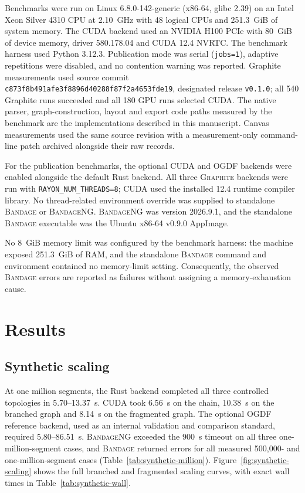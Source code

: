 \documentclass[11pt]{article}
\newcommand{\graphite}{\textsc{Graphite}\xspace}
\newcommand{\bandage}{\textsc{Bandage}\xspace}
\newcommand{\bandageng}{\textsc{BandageNG}\xspace}
\begin{document}
Benchmarks were run on Linux 6.8.0-142-generic (x86-64, glibc 2.39) on an Intel Xeon Silver 4310 CPU at 2.10~GHz with 48 logical CPUs and 251.3~GiB of system memory. The CUDA backend used an NVIDIA H100 PCIe with 80~GiB of device memory, driver 580.178.04 and CUDA 12.4 NVRTC. The benchmark harness used Python 3.12.3. Publication mode was serial (\texttt{jobs=1}), adaptive repetitions were disabled, and no contention warning was reported. Graphite measurements used source commit \texttt{c873f8b491afe3f8896d40288f87f2a4653fde19}, designated release \texttt{v0.1.0}; all 540 Graphite runs succeeded and all 180 GPU runs selected CUDA. The native parser, graph-construction, layout and export code paths measured by the benchmark are the implementations described in this manuscript. Canvas measurements used the same source revision with a measurement-only command-line patch archived alongside their raw records.

For the publication benchmarks, the optional CUDA and OGDF backends were enabled alongside the default Rust backend. All three \graphite backends were run with \texttt{RAYON\_NUM\_THREADS=8}; CUDA used the installed 12.4 runtime compiler library. No thread-related environment override was supplied to standalone \bandage or \bandageng. \bandageng was version 2026.9.1, and the standalone \bandage executable was the Ubuntu x86-64 v0.9.0 AppImage.

No 8~GiB memory limit was configured by the benchmark harness: the machine exposed 251.3~GiB of RAM, and the standalone \bandage command and environment contained no memory-limit setting. Consequently, the observed \bandage errors are reported as failures without assigning a memory-exhaustion cause.

\section{Results}
\subsection{Synthetic scaling}
At one million segments, the Rust backend completed all three controlled topologies in 5.70--13.37~s. CUDA took 6.56~s on the chain, 10.38~s on the branched graph and 8.14~s on the fragmented graph. The optional OGDF reference backend, used as an internal validation and comparison standard, required 5.80--86.51~s. \bandageng exceeded the 900~s timeout on all three one-million-segment cases, and \bandage returned errors for all measured 500,000- and one-million-segment cases (Table~\ref{tab:synthetic-million}). Figure~\ref{fig:synthetic-scaling} shows the full branched and fragmented scaling curves, with exact wall times in Table~\ref{tab:synthetic-wall}.
\end{document}
